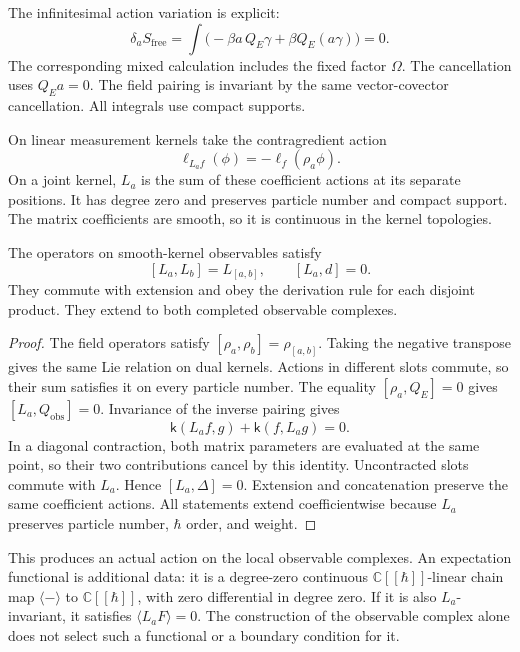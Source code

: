 The infinitesimal action variation is explicit:
\[
 \delta_a S_{\mathrm{free}}
 =\int\bigl(-\beta a\,Q_E\gamma
          +\beta Q_E(a\gamma)\bigr)=0.
\]
The corresponding mixed calculation includes the fixed factor $\Omega$.
The cancellation uses $Q_Ea=0$.
The field pairing is invariant by the same vector-covector cancellation.
All integrals use compact supports.

On linear measurement kernels take the contragredient action
\[
 \ell_{L_af}(\phi)=-\ell_f(\rho_a\phi).
\]
On a joint kernel, $L_a$ is the sum of these coefficient actions at
its separate positions. It has degree zero and preserves particle number
and compact support. The matrix coefficients are smooth, so it is
continuous in the kernel topologies.

\begin{proposition}\label{prop:clo-observable-symmetry}
The operators on smooth-kernel observables satisfy
\[
 [L_a,L_b]=L_{[a,b]},\qquad [L_a,d]=0.
\]
They commute with extension and obey the derivation rule for each
disjoint product. They extend to both completed observable complexes.
\end{proposition}

\begin{proof}
The field operators satisfy $[\rho_a,\rho_b]=\rho_{[a,b]}$.
Taking the negative transpose gives the same Lie relation on dual kernels.
Actions in different slots commute, so their sum satisfies it on every
particle number.
The equality $[\rho_a,Q_E]=0$ gives $[L_a,Q_{\mathrm{obs}}]=0$.
Invariance of the inverse pairing gives
\[
 \mathsf k(L_af,g)+\mathsf k(f,L_ag)=0.
\]
In a diagonal contraction, both matrix parameters are evaluated at the
same point, so their two contributions cancel by this identity.
Uncontracted slots commute with $L_a$. Hence $[L_a,\Delta]=0$.
Extension and concatenation preserve the same coefficient actions.
All statements extend coefficientwise because $L_a$ preserves particle
number, $\hbar$ order, and weight.
\end{proof}

This produces an actual action on the local observable complexes.
An expectation functional is additional data: it is a degree-zero
continuous $\mathbb C[[\hbar]]$-linear chain map $\langle-\rangle$ to
$\mathbb C[[\hbar]]$, with zero differential in degree zero.
If it is also $L_a$-invariant, it satisfies
$\langle L_aF\rangle=0$.
The construction of the observable complex alone does not select such
a functional or a boundary condition for it.

